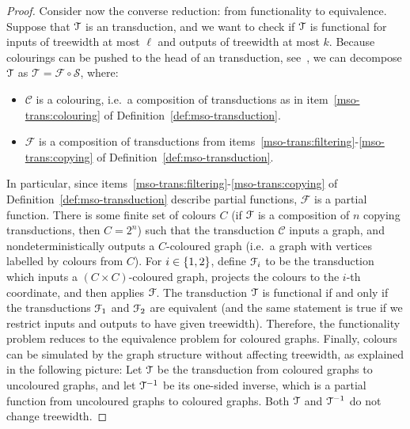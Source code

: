 \begin{proof}
    Consider now the converse reduction: from functionality to equivalence. Suppose that ${\mathcal T}$ is an \mso transduction, and we want to check if ${\mathcal T}$ is functional for inputs of treewidth at most $\ell$ and outputs of treewidth at most $k$. Because colourings can be pushed to the head of an \mso transduction, see~\cite[Section 1.7]{courcelleGraphStructureMonadic2012}, we can decompose ${\mathcal T}$ as $\mathcal T =  \mathcal F \circ \mathcal S$, where:
    \begin{itemize}
        \item $\mathcal C$ is a colouring, i.e.~a composition of transductions as in item~\ref{mso-trans:colouring} of Definition~\ref{def:mso-transduction}.
        \item $\mathcal F$ is a composition of transductions from items~\ref{mso-trans:filtering}-\ref{mso-trans:copying} of Definition~\ref{def:mso-transduction}.
    \end{itemize}
    In particular, since items~\ref{mso-trans:filtering}-\ref{mso-trans:copying} of Definition~\ref{def:mso-transduction} describe partial functions,  $\mathcal F$ is a partial function. There is some finite set of colours $C$ (if ${\mathcal F}$ is a composition of $n$ copying transductions, then $C=2^n$) such that the  transduction $\mathcal C$ inputs a graph, and nondeterministically outputs a $C$-coloured graph (i.e.~a graph with vertices labelled by colours from $C$). For $i  \in \{1,2\}$, define ${\mathcal F}_i$ to be the \mso transduction which inputs a $(C \times C)$-coloured  graph, projects the colours to the $i$-th coordinate, and then applies ${\mathcal F}$. The transduction ${\mathcal T}$ is functional if and only if the transductions ${\mathcal F}_1$ and ${\mathcal F}_2$ are equivalent (and the same statement is true if we restrict inputs and outputs to have given treewidth). Therefore, the functionality problem reduces to the equivalence problem for coloured graphs. Finally, colours can be simulated by the graph structure without affecting treewidth,  as explained in the following picture:
    Let ${\mathcal T}$ be the \mso transduction from coloured graphs to uncoloured graphs, and let ${\mathcal T}^{-1}$ be its one-sided inverse, which is a partial function from uncoloured graphs to coloured graphs.
    Both ${\mathcal T}$ and ${\mathcal T}^{-1}$ do not change treewidth. 

\end{proof}
